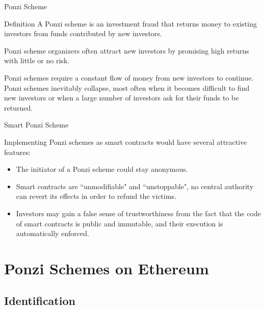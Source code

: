 \documentclass[aspectratio=169,10pt]{beamer}
\begin{document}
\begin{frame}{Ponzi Scheme}
\begin{block}{Definition \footnotemark}
A Ponzi scheme is an investment fraud that returns money to existing investors from funds contributed by new investors. \medskip
    
Ponzi scheme organizers often attract new investors by promising high returns with little or no risk. \medskip

Ponzi schemes require a constant 
flow of money from new investors to continue. Ponzi schemes inevitably collapse, most often when it becomes difficult to find new investors or when a large number of investors ask for their funds to be returned. 
\end{block}


\end{frame}

\begin{frame}{Smart Ponzi Scheme}

Implementing Ponzi schemes as smart contracts would have several attractive features: \bigskip

\begin{itemize}
\item The initiator of a Ponzi scheme could stay anonymous.
\item Smart contracts are ``unmodifiable" and ``unstoppable", no central
authority can revert its effects in order to refund the victims.
\item Investors may gain a false sense of trustworthiness from the fact that the
code of smart contracts is public and immutable, and their execution is
automatically enforced.
\end{itemize}

\end{frame}


\section{Ponzi Schemes on Ethereum}

\subsection{Identification}
\end{document}
